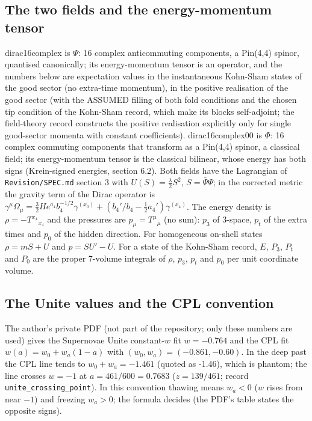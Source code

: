 \documentclass[11pt]{article}
\begin{document}
\subsection{The two fields and the energy-momentum tensor}

dirac16complex is $\Psi$: 16 complex anticommuting components, a Pin(4,4) spinor, quantised canonically; its energy-momentum tensor is an operator, and the numbers below are expectation values in the instantaneous Kohn-Sham states of the good sector (no extra-time momentum), in the positive realisation of the good sector (with the ASSUMED filling of both fold conditions and the chosen tip condition of the Kohn-Sham record, which make its blocks self-adjoint; the field-theory record constructs the positive realisation explicitly only for single good-sector momenta with constant coefficients). dirac16complex00 is $\Phi$: 16 complex commuting components that transform as a Pin(4,4) spinor, a classical field; its energy-momentum tensor is the classical bilinear, whose energy has both signs (Krein-signed energies, section 6.2). Both fields have the Lagrangian of \texttt{Revision\allowbreak{}/SPEC.md} section 3 with $U(S) = \frac{\lambda}{2}S^2$, $S = \bar\Psi\Psi$; in the corrected metric the gravity term of the Dirac operator is $\gamma^\mu\Omega_\mu = \frac32He^{a_4}b_4^{-1/2}\gamma^{(x_0)} + (b_4'/b_4 - \frac12a_4')\gamma^{(x_4)}$. The energy density is $\rho = -T^{x_4}{}_{x_4}$ and the pressures are $p_\mu = T^\mu{}_\mu$ (no sum): $p_3$ of 3-space, $p_t$ of the extra times and $p_0$ of the hidden direction. For homogeneous on-shell states $\rho = mS + U$ and $p = SU' - U$. For a state of the Kohn-Sham record, $E$, $P_3$, $P_t$ and $P_0$ are the proper 7-volume integrals of $\rho$, $p_3$, $p_t$ and $p_0$ per unit coordinate volume.

\subsection{The Unite values and the CPL convention}

The author's private PDF (not part of the repository; only these numbers are used) gives the Supernovae Unite constant-$w$ fit $w = -0.764$ and the CPL fit $w(a) = w_0 + w_a(1-a)$ with $(w_0, w_a) = (-0.861, -0.60)$. In the deep past the CPL line tends to $w_0 + w_a = -1.461$ (quoted as -1.46), which is phantom; the line crosses $w = -1$ at $a = 461/600 = 0.7683$ ($z = 139/461$; record \texttt{unite\_cr\allowbreak{}ossing\_p\allowbreak{}oint}). In this convention thawing means $w_a < 0$ ($w$ rises from near $-1$) and freezing $w_a > 0$; the formula decides (the PDF's table states the opposite signs).
\end{document}
